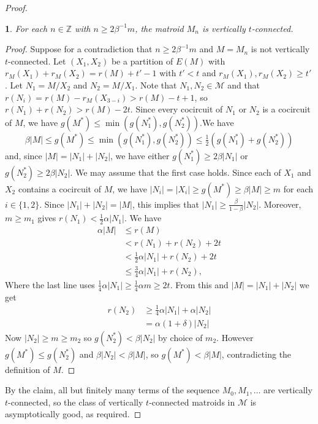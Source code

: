 \documentclass[12pt]{amsart}
\newtheorem{claim}{}[theorem]
\theoremstyle{definition}
\newcommand{\bZ}{\mathbb Z}
\newcommand{\cM}{\mathcal{M}}
\newcommand{\con}{/}
\begin{document}
\begin{proof}
  \begin{claim}
    For each $n \in \bZ$ with $n \ge 2\beta^{-1}m$, the matroid $M_n$ is vertically $t$-connected. 
  \end{claim}
  \begin{proof}
    Suppose for a contradiction that $n \ge 2\beta^{-1}m$ and $M = M_n$ is not vertically $t$-connected. Let $(X_1,X_2)$ be a partition of $E(M)$ with $r_M(X_1) + r_M(X_2) = r(M) + t' - 1$ with $t' < t$ and $r_M(X_1),r_M(X_2) \ge t'$. Let $N_1 = M\con X_2$ and $N_2 = M \con X_1$. Note that $N_1,N_2 \in \cM$ and that $r(N_i) = r(M)-r_M(X_{3-i}) > r(M)-t+1$, so $r(N_1) + r(N_2) > r(M)-2t$. Since every cocircuit of $N_1$ or $N_2$ is a cocircuit of $M$, we have $g(M^*) \le \min(g(N_1^*),g(N_2^*))$.We have
        \[ \beta|M| \le g(M^*) \le \min(g(N_1^*),g(N_2^*)) \le \tfrac{1}{2}(g(N_1^*) + g(N_2^*))\]
    and, since $|M| = |N_1| + |N_2|$, we have either $g(N_1^*) \ge 2\beta|N_1|$ or $g(N_2^*) \ge 2\beta|N_2|$. We may assume that the first case holds. Since each of $X_1$ and $X_2$ contains a cocircuit of $M$, we have $|N_i| = |X_i| \ge g(M^*) \ge \beta|M| \ge m$ for each $i \in \{1,2\}$. Since $|N_1| + |N_2| = |M|$, this implies that $|N_1| \ge \tfrac{\beta}{1-\beta}|N_2|$. Moreover, $m \ge m_1$ gives $r(N_1) < \tfrac{1}{2}\alpha|N_1|$. We have 
    \begin{align*}
      \alpha|M| &\le r(M) \\
            &< r(N_1) + r(N_2) + 2t\\
            &< \tfrac{1}{2}\alpha|N_1| + r(N_2) + 2t\\
            &\le \tfrac{3}{4}\alpha|N_1| + r(N_2),
    \end{align*}
    Where the last line uses $\tfrac{1}{4}\alpha|N_1| \ge \tfrac{1}{4}\alpha m \ge 2t$. From this and $|M| = |N_1|+|N_2|$ we get 
    \begin{align*}
      r(N_2) &\ge \tfrac{1}{4}\alpha|N_1| + \alpha|N_2|\\
           &= \alpha\left(1 + \delta \right)|N_2|
    \end{align*} 
    Now $|N_2| \ge m \ge m_2$ so $g(N_2^*) < \beta |N_2|$ by choice of $m_2$. However $g(M^*) \le g(N_2^*)$ and $\beta|N_2| < \beta|M|$, so $g(M^*) < \beta|M|$, contradicting the definition of $M$. 
  \end{proof}
  By the claim, all but finitely many terms of the sequence $M_0,M_1, \dotsc$ are vertically $t$-connected, so the class of vertically $t$-connected matroids in $\cM$ is asymptotically good, as required. 
\end{proof}
  
\end{document}
